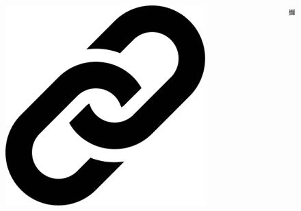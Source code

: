 \begin{columns}[c]
	\begin{column}{0.1\textwidth}
		\begin{figure}[h]
			\includegraphics[width=0.5\columnwidth]{icons/url.pdf}
		\end{figure}
	\end{column}
	\begin{column}{0.6\textwidth}
		\large{
			\color{boxbkseablue}
			\textbf{\getUrlList}
		}
	\end{column}
	\begin{column}{0.3\textwidth}
		\begin{figure}[h]
			\includegraphics[width=0.6\columnwidth]{docs/imgs/poc.png}
		\end{figure}
		\hfill
	\end{column}
\end{columns}